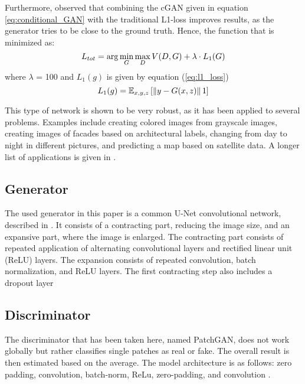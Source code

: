 Furthermore, \cite{isola2017image} observed that combining the cGAN given in equation \ref{eq:conditional_GAN} with the traditional L1-loss improves results, as the generator tries to be close to the ground truth. Hence, the function that is minimized as:
\begin{equation}
	\centering
	L_{tot} = \arg \min_{G} \max_{D} V(D, G) + \lambda \cdot L_1(G)
	\label{eq:total_gen_loss}
\end{equation}
where $\lambda$ = 100 and $L_1(g)$ is given by equation (\ref{eq:l1_loss})
\begin{equation}
	\centering
	L_1(g) = \mathbb{E}_{x,y,z} \left[ \norm{y - G(x,z)}_1 \right]
	\label{eq:l1_loss}
\end{equation}

This type of network is shown to be very robust, as it has been applied to several problems. Examples include creating colored images from grayscale images, creating images of facades based on architectural labels, changing from day to night in different pictures, and predicting a map based on satellite data. A longer list of applications is given in \cite{isola2017image}. 


\subsection{Generator}
The used generator in this paper is a common U-Net convolutional network, described in \cite{ronneberger2015u}. It consists of a contracting part, reducing the image size, and an expansive part, where the image is enlarged. The contracting part consists of repeated application of alternating convolutional layers and rectified linear unit (ReLU) layers. The expansion consists of repeated convolution, batch normalization, and ReLU layers. The first contracting step also includes a dropout layer \cite{isola2017image} 

\subsection{Discriminator}
The discriminator that has been taken here, named PatchGAN, does not work globally but rather classifies single patches as real or fake. The overall result is then estimated based on the average. The model architecture is as follows: zero padding, convolution, batch-norm, ReLu, zero-padding, and convolution \cite{isola2017image}.
